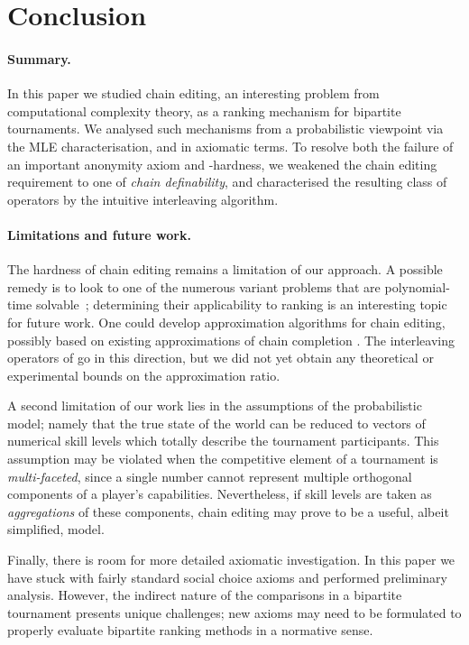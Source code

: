 \section{Conclusion}
\label{tourn_sec_conclusion}

\paragraph{Summary.}
%
In this paper we studied chain editing, an interesting problem from
computational complexity theory, as a ranking mechanism for bipartite
tournaments. We analysed such mechanisms from a probabilistic viewpoint via the
MLE characterisation, and in axiomatic terms. To resolve both the failure of an
important anonymity axiom and -hardness, we weakened the
chain editing requirement to one of \emph{chain definability}, and
characterised the resulting class of operators by the intuitive interleaving
algorithm.

\paragraph{Limitations and future work.}
%
The hardness of chain editing remains a limitation of our approach. A possible
remedy is to look to one of the numerous variant problems that are
polynomial-time solvable~\cite{jiao2017algorithms}; determining their
applicability to ranking is an interesting topic for future work. One could
develop approximation algorithms for chain editing, possibly based on existing
approximations of chain completion \cite{natanzon2000polynomial}. The
interleaving operators of  go in this direction, but we
did not yet obtain any theoretical or experimental bounds on the approximation
ratio.

A second limitation of our work lies in the assumptions of the probabilistic
model; namely that the true state of the world can be reduced to vectors of
numerical skill levels which totally describe the tournament participants. This
assumption may be violated when the competitive element of a tournament is
\emph{multi-faceted}, since a single number cannot represent multiple
orthogonal components of a player's capabilities. Nevertheless, if skill levels
are taken as \emph{aggregations} of these components, chain editing may prove
to be a useful, albeit simplified, model.

Finally, there is room for more detailed axiomatic investigation. In this paper
we have stuck with fairly standard social choice axioms and performed
preliminary analysis. However, the indirect nature of the comparisons in a
bipartite tournament presents unique challenges; new axioms may need to be
formulated to properly evaluate bipartite ranking methods in a normative
sense.

